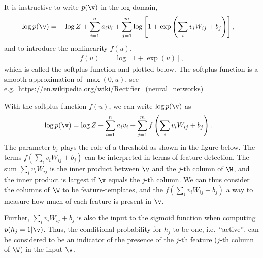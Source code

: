\begin{exenumerate}
\begin{solution}
       It is instructive to write $p(\v)$ in the log-domain,
       \begin{align}
         \log p(\v) & = -\log Z + \sum_{i=1}^n a_i v_i + \sum_{j=1}^m \log\left[1+ \exp\left(\sum_i v_i W_{ij} + b_j \right)\right],
       \end{align}
       and to introduce the nonlinearity $f(u)$,
       \begin{align}
         f(u) & = \log\left[ 1+\exp(u) \right],
       \end{align}
       which is called the softplus function and plotted below. The softplus function is a smooth approximation of $\max(0,u)$, see e.g.\ \url{https://en.wikipedia.org/wiki/Rectifier_(neural_networks)}
       \begin{center}
         \vspace{3ex}
      \end{center}
       With the softplus function $f(u)$, we can write $\log p(\v)$ as
       \begin{align}
         \log p(\v) & = \log Z + \sum_{i=1}^n a_i v_i + \sum_{j=1}^m f\left(\sum_i v_i W_{ij} + b_j \right).
       \end{align}
       The parameter $b_j$ plays the role of a threshold as shown in
       the figure below. The terms $f\left(\sum_i v_i W_{ij} + b_j
       \right)$ can be interpreted in terms of feature detection. The
       sum $\sum_i v_i W_{ij}$ is the inner product between $\v$ and
       the $j$-th column of $\W$, and the inner product is largest if
       $\v$ equals the $j$-th column. We can thus consider the columns
       of $\W$ to be feature-templates, and the $f\left(\sum_i v_i
       W_{ij} + b_j \right)$ a way to measure how much of each feature
       is present in $\v$.

       Further, $\sum_i v_i W_{ij} +b_j$ is also the input to the
       sigmoid function when computing $p(h_j=1 | \v)$. Thus, the
       conditional probability for $h_j$ to be one, i.e.\ ``active'',
       can be considered to be an indicator of the presence of the
       $j$-th feature ($j$-th column of $\W$) in the input $\v$.


\end{solution}
\end{exenumerate}

